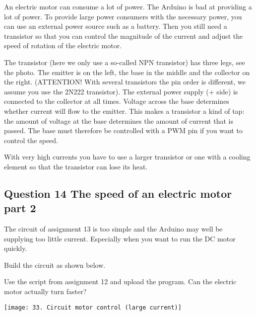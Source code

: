\documentclass{arduino}
\begin{document}



An electric motor can consume a lot of power. The Arduino is bad at providing a lot of power. To provide large power consumers with the necessary power, you can use an external power source such as a battery. Then you still need a transistor so that you can control the magnitude of the current and adjust the speed of rotation of the electric motor.

The transistor (here we only use a so-called NPN transistor) has three legs, see the photo. The emitter is on the left, the base in the middle and the collector on the right. (ATTENTION! With several transistors the pin order is different, we assume you use the 2N222 transistor). The external power supply (+ side) is connected to the collector at all times. Voltage across the base determines whether current will flow to the emitter. This makes a transistor a kind of tap: the amount of voltage at the base determines the amount of current that is passed. The base must therefore be controlled with a PWM pin if you want to control the speed.

With very high currents you have to use a larger transistor or one with a cooling element so that the transistor can lose its heat.

\subsection{Question 14 The speed of an electric motor part 2}

The circuit of assignment 13 is too simple and the Arduino may well be supplying too little current. Especially when you want to run the DC motor quickly.

\begin{alphalist}
\item Build the circuit as shown below.

\item Use the script from assignment 12 and upload the program. Can the electric motor actually turn faster?
\end{alphalist}

\begin{center}
\texttt{[image: 33. Circuit motor control (large current)]}
\end{center}
\end{document}
